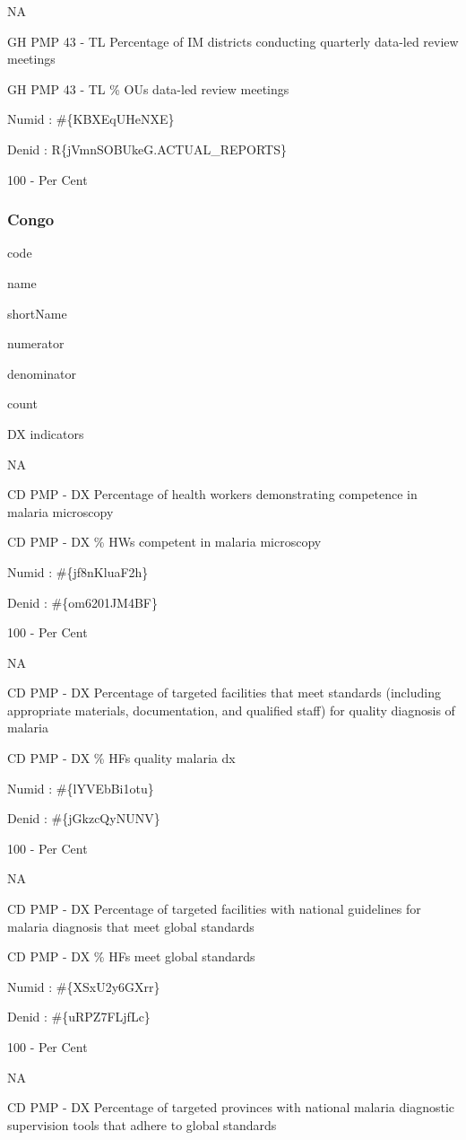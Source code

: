 \documentclass[]{book}
\begin{document}
NA

GH PMP 43 - TL Percentage of IM districts conducting quarterly data-led review meetings

GH PMP 43 - TL \% OUs data-led review meetings

Numid : \#\{KBXEqUHeNXE\}

Denid : R\{jVmnSOBUkeG.ACTUAL\_REPORTS\}

100 - Per Cent

\hypertarget{congo}{%
\subsubsection{Congo}\label{congo}}

code

name

shortName

numerator

denominator

count

DX indicators

NA

CD PMP - DX Percentage of health workers demonstrating competence in malaria microscopy

CD PMP - DX \% HWs competent in malaria microscopy

Numid : \#\{jf8nKluaF2h\}

Denid : \#\{om6201JM4BF\}

100 - Per Cent

NA

CD PMP - DX Percentage of targeted facilities that meet standards (including appropriate materials, documentation, and qualified staff) for quality diagnosis of malaria

CD PMP - DX \% HFs quality malaria dx

Numid : \#\{lYVEbBi1otu\}

Denid : \#\{jGkzcQyNUNV\}

100 - Per Cent

NA

CD PMP - DX Percentage of targeted facilities with national guidelines for malaria diagnosis that meet global standards

CD PMP - DX \% HFs meet global standards

Numid : \#\{XSxU2y6GXrr\}

Denid : \#\{uRPZ7FLjfLc\}

100 - Per Cent

NA

CD PMP - DX Percentage of targeted provinces with national malaria diagnostic supervision tools that adhere to global standards
\end{document}
